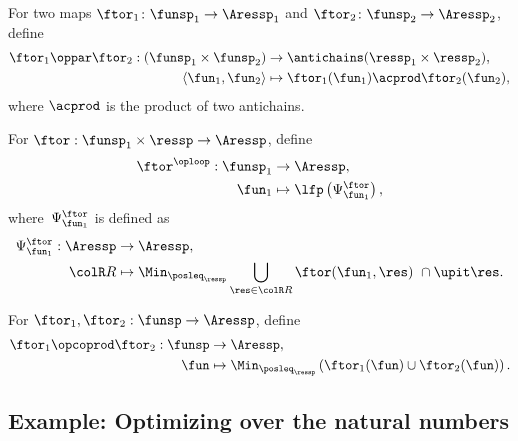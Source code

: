\begin{definition} \label{def:oppar}
  For two maps $\ftor_{1}\colon\funsp_{1}\rightarrow\Aressp_{1}$
  and $\ftor_{2}\colon\funsp_{2}\rightarrow\Aressp_{2}$, define
  \begin{align}
    \ftor_{1}\oppar\ftor_{2}:(\funsp_{1}\times\funsp_{2}) & \rightarrow\antichains(\ressp_{1}\times\ressp_{2}),\label{eq:oppar}\\
    \left\langle \fun_{1},\fun_{2}\right\rangle  & \mapsto\ftor_{1}(\fun_{1})\acprod\ftor_{2}(\fun_{2}),\nonumber
  \end{align}
  where $\acprod$ is the product of two antichains.
\end{definition}

\begin{definition}
  \label{def:oploop1}
  For $\ftor:\funsp_{1}\times\ressp\rightarrow\Aressp$,
  define
  \begin{align}
    \ftor^{\oploop}:\funsp_{1} & \rightarrow\Aressp,\nonumber \\
    \fun_{1} & \mapsto\lfp\left(\Psi_{\fun_{1}}^{\ftor}\right),
  \end{align}
  where~$\Psi_{\fun_{1}}^{\ftor}$ is defined as
  \begin{align}
    \Psi_{\fun_{1}}^{\ftor}:\Aressp & \rightarrow\Aressp,\nonumber \\
    {\colR R} & \mapsto\Min_{\posleq_{\ressp}}\bigcup_{\res\in{\colR R}}\ftor(\fun_{1},\res)\ \cap\upit\res.\label{eq:phi}
  \end{align}
\end{definition}

\begin{definition}
  \label{def:opcoprod}For $\ftor_{1},\ftor_{2}:\funsp\rightarrow\Aressp$,
  define
  \begin{align*}
    \ftor_{1}\opcoprod\ftor_{2}:\funsp & \rightarrow\Aressp,\\
    \fun& \mapsto\Min_{\posleq_{\ressp}}\left(\ftor_{1}(\fun)\cup\ftor_{2}(\fun)\right).
  \end{align*}
\end{definition}

\subsection{Example: Optimizing over the natural numbers}

